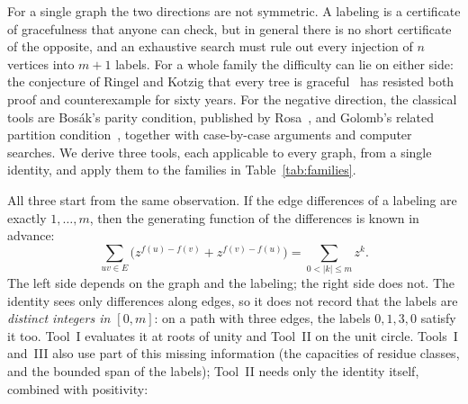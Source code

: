 \documentclass[11pt]{amsart}
\theoremstyle{tplain}
\theoremstyle{tdefinition}
\theoremstyle{tremark}
\begin{document}
For a single graph the two directions are not symmetric. A labeling is a
certificate of gracefulness that anyone can check, but in general there is no
short certificate of the opposite, and an exhaustive search must rule out
every injection of $n$ vertices into $m+1$ labels. For a whole family the
difficulty can lie on either side: the conjecture of Ringel and Kotzig that
every tree is graceful~\cite{gallian} has resisted both proof and
counterexample for sixty years. For the negative direction, the classical
tools are Bos\'ak's parity condition, published by
Rosa~\cite{rosa65,rosa}, and Golomb's related partition
condition~\cite{golomb}, together with case-by-case arguments and computer
searches. We derive three tools, each applicable to every graph, from a
single identity, and apply them to the families in Table~\ref{tab:families}.

All three start from the same observation. If the edge differences of a
labeling are exactly $1,\dots,m$, then the generating function of the
differences is known in advance:
\[
  \sum_{uv\in E}\bigl(z^{f(u)-f(v)}+z^{f(v)-f(u)}\bigr)=\sum_{0<|k|\le m}z^k .
\]
The left side depends on the graph and the labeling; the right side does not.
The identity sees only differences along edges, so it does not record that
the labels are \emph{distinct integers in $[0,m]$}: on a path with three
edges, the labels $0,1,3,0$ satisfy it too. Tool~I evaluates it at roots of
unity and Tool~II on the unit circle. Tools~I and~III
also use part of this missing information (the capacities of residue
classes, and the bounded span of the labels); Tool~II needs only the identity
itself, combined with positivity:
\end{document}
